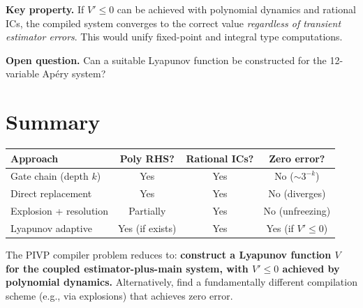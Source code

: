 \documentclass[11pt]{article}
\theoremstyle{definition}
\theoremstyle{remark}
\begin{document}
\textbf{Key property.} If $V' \le 0$ can be achieved with polynomial dynamics and rational ICs, the compiled system converges to the correct value \emph{regardless of transient estimator errors}. This would unify fixed-point and integral type computations.

\textbf{Open question.} Can a suitable Lyapunov function be constructed for the 12-variable Apéry system?

\section{Summary}

\begin{center}
\renewcommand{\arraystretch}{1.3}
\begin{tabular}{lccc}
\hline
\textbf{Approach} & \textbf{Poly RHS?} & \textbf{Rational ICs?} & \textbf{Zero error?} \\
\hline
Gate chain (depth $k$) & Yes & Yes & No ($\sim 3^{-k}$) \\
Direct replacement & Yes & Yes & No (diverges) \\
Explosion + resolution & Partially & Yes & No (unfreezing) \\
Lyapunov adaptive & Yes (if exists) & Yes & Yes (if $V' \le 0$) \\
\hline
\end{tabular}
\end{center}

The PIVP compiler problem reduces to: \textbf{construct a Lyapunov function $V$ for the coupled estimator-plus-main system, with $V' \le 0$ achieved by polynomial dynamics.} Alternatively, find a fundamentally different compilation scheme (e.g., via explosions) that achieves zero error.
\end{document}
